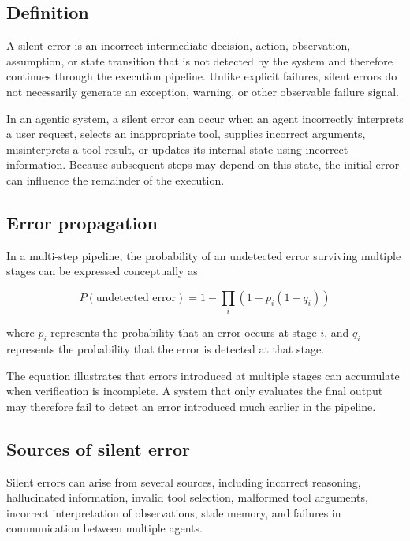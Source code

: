 \documentclass[12pt]{article}
\begin{document}
\subsection{Definition}
\label{sec:silent-error-definition}

A silent error is an incorrect intermediate decision, action, observation,
assumption, or state transition that is not detected by the system and therefore
continues through the execution pipeline. Unlike explicit failures, silent
errors do not necessarily generate an exception, warning, or other observable
failure signal.

In an agentic system, a silent error can occur when an agent incorrectly
interprets a user request, selects an inappropriate tool, supplies incorrect
arguments, misinterprets a tool result, or updates its internal state using
incorrect information. Because subsequent steps may depend on this state, the
initial error can influence the remainder of the execution.

\subsection{Error propagation}
\label{sec:error-propagation}

In a multi-step pipeline, the probability of an undetected error surviving
multiple stages can be expressed conceptually as

\begin{equation}
P(\text{undetected error})
=
1-\prod_i \left(1-p_i(1-q_i)\right)
\label{eq:undetected-error}
\end{equation}

where $p_i$ represents the probability that an error occurs at stage $i$, and
$q_i$ represents the probability that the error is detected at that stage.

The equation illustrates that errors introduced at multiple stages can
accumulate when verification is incomplete. A system that only evaluates the
final output may therefore fail to detect an error introduced much earlier in
the pipeline.

\subsection{Sources of silent error}
\label{sec:error-sources}

Silent errors can arise from several sources, including incorrect reasoning,
hallucinated information, invalid tool selection, malformed tool arguments,
incorrect interpretation of observations, stale memory, and failures in
communication between multiple agents.
\end{document}
